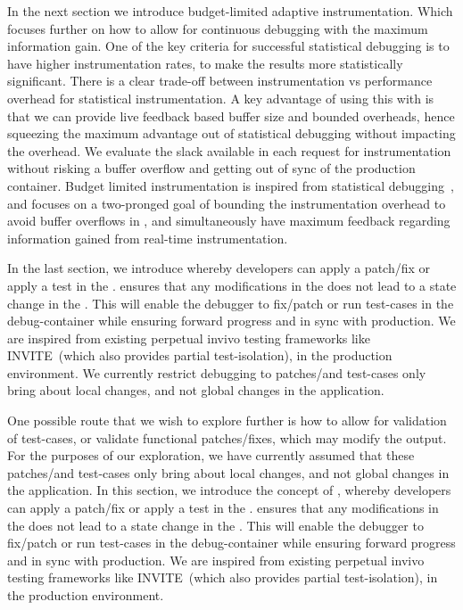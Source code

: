 In the next section we introduce budget-limited adaptive instrumentation. Which focuses further on how to allow for continuous debugging with the maximum information gain.
One of the key criteria for successful statistical debugging is to have higher instrumentation rates, to make the results more statistically significant. 
There is a clear trade-off between instrumentation vs performance overhead for statistical instrumentation. 
A key advantage of using this with \parikshan is that we can provide live feedback based buffer size and bounded overheads, hence squeezing the maximum advantage out of statistical debugging without impacting the overhead. 
We evaluate the slack available in each request for instrumentation without risking a buffer overflow and getting out of sync of the production container.
Budget limited instrumentation is inspired from statistical debugging~\cite{statisticalDebugging}, and focuses on a two-pronged goal of bounding the instrumentation overhead to avoid buffer overflows in \parikshan, and simultaneously have maximum feedback regarding information gained from real-time instrumentation.

In the last section, we introduce \activedebugging whereby developers can apply a patch/fix or apply a test in the \debugcontainer.
\activedebugging ensures that any modifications in the \debugcontainer does not lead to a state change in the \productioncontainer.
This will enable the debugger to fix/patch or run test-cases in the debug-container while ensuring forward progress and in sync with production. 
We are inspired from existing perpetual invivo testing frameworks like INVITE~\cite{invivo}(which also provides partial test-isolation), in the production environment.
We currently restrict \active debugging to patches/and test-cases only bring about local changes, and not global changes in the application.




\iffalse
One possible route that we wish to explore further is how to allow for validation of test-cases, or validate functional patches/fixes, which may modify the output.
For the purposes of our exploration, we have currently assumed that these patches/and test-cases only bring about local changes, and not global changes in the application.
In this section, we introduce the concept of \activedebugging, whereby developers can apply a patch/fix or apply a test in the \debugcontainer.
\activedebugging ensures that any modifications in the \debugcontainer does not lead to a state change in the \productioncontainer.
This will enable the debugger to fix/patch or run test-cases in the debug-container while ensuring forward progress and in sync with production. 
We are inspired from existing perpetual invivo testing frameworks like INVITE~\cite{invivo}(which also provides partial test-isolation), in the production environment.

